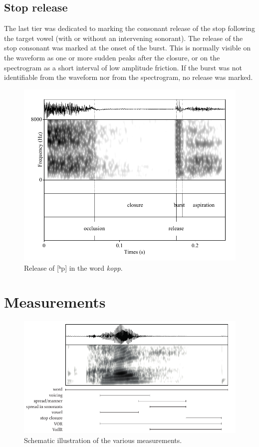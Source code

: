 \documentclass[11pt,a4paper,openany]{memoir}\usepackage[]{graphicx}\usepackage[]{color}
\begin{document}
\subsection{Stop release}
The last tier was dedicated to marking the consonant release of the stop following the target vowel (with or without an intervening sonorant).
The release of the stop consonant was marked at the onset of the burst.
This is normally visible on the waveform as one or more sudden peaks after the closure, or on the spectrogram as a short interval of low amplitude friction.
If the burst was not identifiable from the waveform nor from the spectrogram, no release was marked.

\begin{figure}
\centering
\includegraphics[width=\textwidth]{kopp}
\caption{Release of [ʰp] in the word \textit{kopp}.}
\label{f:release}
\end{figure}

\section{Measurements}
\label{s:measurements}

\begin{figure}
\centering
\includegraphics[width=\linewidth]{../img/measures}
\caption[yo]{Schematic illustration of the various measurements.}
\label{f:measures}
\end{figure}
\end{document}
